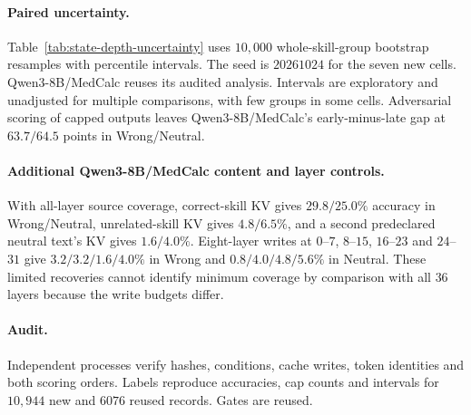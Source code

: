 \paragraph{Paired uncertainty.}
Table~\ref{tab:state-depth-uncertainty} uses $10{,}000$ whole-skill-group
bootstrap resamples with percentile intervals. The seed is $20261024$
for the seven new cells. Qwen3-8B/MedCalc reuses its audited analysis.
Intervals are exploratory and unadjusted for multiple comparisons, with
few groups in some cells. Adversarial scoring of capped outputs leaves
Qwen3-8B/MedCalc's early-minus-late gap at $63.7/64.5$ points in Wrong/Neutral.

\paragraph{Additional Qwen3-8B/MedCalc content and layer controls.}
With all-layer source coverage, correct-skill KV gives $29.8/25.0\%$
accuracy in Wrong/Neutral, unrelated-skill KV gives $4.8/6.5\%$, and a
second predeclared neutral text's KV gives $1.6/4.0\%$. Eight-layer
writes at $0$--$7$, $8$--$15$, $16$--$23$ and $24$--$31$ give
$3.2/3.2/1.6/4.0\%$ in Wrong and $0.8/4.0/4.8/5.6\%$ in Neutral.
These limited recoveries cannot identify minimum coverage by comparison
with all $36$ layers because the write budgets differ.


\paragraph{Audit.}
Independent processes verify hashes, conditions, cache writes, token
identities and both scoring orders. Labels reproduce accuracies, cap counts
and intervals for $10{,}944$ new and $6076$ reused records. Gates are reused.
